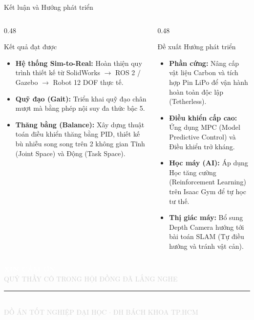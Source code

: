 \documentclass[10pt,aspectratio=169]{beamer}
\begin{document}
\begin{frame}{Kết luận và Hướng phát triển}
  \begin{columns}[T]
      \begin{column}{0.48\textwidth}
          \begin{block}{Kết quả đạt được}
              \small
              \begin{itemize}
                  \item \textbf{Hệ thống Sim-to-Real:} Hoàn thiện quy trình thiết kế từ SolidWorks $\rightarrow$ ROS 2 / Gazebo $\rightarrow$ Robot 12 DOF thực tế.
                  \item \textbf{Quỹ đạo (Gait):} Triển khai quỹ đạo chân mượt mà bằng phép nội suy đa thức bậc 5.
                  \item \textbf{Thăng bằng (Balance):} Xây dựng thuật toán điều khiển thăng bằng PID, thiết kế bù nhiễu song song trên 2 không gian Tĩnh (Joint Space) và Động (Task Space).
              \end{itemize}
          \end{block}
      \end{column}
      \begin{column}{0.48\textwidth}
          \begin{alertblock}{Đề xuất Hướng phát triển}
              \small
              \begin{itemize}
                  \item \textbf{Phần cứng:} Nâng cấp vật liệu Carbon và tích hợp Pin LiPo để vận hành hoàn toàn độc lập (Tetherless).
                  \item \textbf{Điều khiển cấp cao:} Ứng dụng MPC (Model Predictive Control) và Điều khiển trở kháng.
                  \item \textbf{Học máy (AI):} Áp dụng Học tăng cường (Reinforcement Learning) trên Isaac Gym để tự học tư thế.
                  \item \textbf{Thị giác máy:} Bổ sung Depth Camera hướng tới bài toán SLAM (Tự điều hướng và tránh vật cản).
              \end{itemize}
          \end{alertblock}
      \end{column}
  \end{columns}
\end{frame}

{
\begin{frame}[plain]
    \begin{center}
        \vspace{2cm}
        {\Huge\bfseries\textcolor{white}{XIN CẢM ƠN}}\\[0.5cm]
        {\Large\textcolor{lightgray}{QUÝ THẦY CÔ TRONG HỘI ĐỒNG ĐÃ LẮNG NGHE}}\\[0.8cm]
        \textcolor{hcmutred}{\rule{8cm}{2pt}}\\[2.5cm]
        {\normalsize\textcolor{lightgray}{ĐỒ ÁN TỐT NGHIỆP ĐẠI HỌC $\cdot$ ĐH BÁCH KHOA TP.HCM}}
    \end{center}
\end{frame}
}
\end{document}
